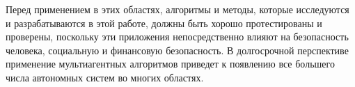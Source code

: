 Перед применением в этих областях, алгоритмы и методы, которые исследуются и разрабатываются в этой работе, должны быть хорошо протестированы и проверены, поскольку эти приложения непосредственно влияют на безопасность человека, социальную и финансовую безопасность. В долгосрочной перспективе применение мультиагентных алгоритмов приведет к появлению все большего числа автономных систем во многих областях. 


